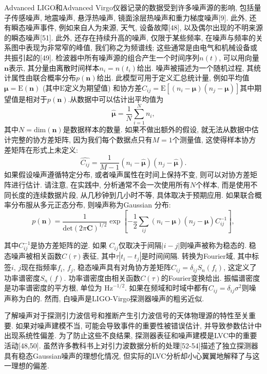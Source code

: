 \documentclass[a4paper]{\documentclassname}
\def\b{\boldsymbol}
\def\t{\text}
\theoremstyle{definition}
\begin{document}
Advanced LIGO和Advanced Virgo仪器记录的数据受到许多噪声源的影响, 包括量子传感噪声, 地震噪声, 悬浮热噪声, 镜面涂层热噪声和重力梯度噪声[9]. 此外, 还有瞬态噪声事件, 例如来自人为来源, 天气, 设备故障[48], 以及偶尔出现的不明来源的瞬态噪声[51]. 此外, 还存在持续升高的噪声, 仅限于某些频率, 在噪声与频率的关系图中表现为非常窄的峰值, 我们称之为频谱线; 这些通常是由电气和机械设备或共振引起的[49]. 检波器中所有噪声源的组合产生一个时间序列$n(t)$, 可以用向量$\b{n}$表示, 其分量由离散时间样本$n_i=n(t_i)$给出. 噪声被描述为一个随机过程, 其统计属性由联合概率分布$p(\b{n})$给出. 此模型可用于定义汇总统计量, 例如平均值$\b{\mu}=\mathrm{E}(\b{n})$ (其中$\mathrm{E}$定义为期望值) 和协方差$C_{ij}=\mathrm{E}[(n_i-\b{\mu})(n_j-\b{\mu})]$其中期望值是相对于$p(\b{n})$.从数据中可以估计出平均值为
\begin{equation}
    \hat{\b{\mu}}=\frac{1}{N}\sum_{i=1}^N n_i,
\end{equation}
其中$N=\mathrm{dim}(\b{n})$是数据样本的数量. 如果不做出额外的假设, 就无法从数据中估计完整的协方差矩阵, 因为我们每个数据点只有$ M = 1 $个测量值, 这使得样本协方差矩阵在形式上未定义:
\begin{equation}
    \hat{C_{ij}}=\frac{1}{M-1}(n_i-\hat{\b{\mu}})(n_j-\hat{\b{\mu}}).
\end{equation}
如果假设噪声遵循特定分布, 或者噪声属性在时间上保持不变, 则可以对协方差矩阵进行估计. 请注意, 在实践中, 分析通常不会一次使用所有$ N $个样本, 而是使用不同长度的连续数据片段, 从几秒钟到几小时不等, 具体取决于预期应用. 如果联合概率分布服从多元正态分布, 则噪声称为Gaussian 分布:
\begin{equation}
    p(\b{n})=\frac{1}{\mathrm{det}(2\pi\b{C})^{1/2}}\exp\left[-\frac{1}{2}\sum_{ij}(n_i-\b{\mu})(n_j-\b{\mu})C_{ij}^{-1}\right],
\end{equation}
 
其中$C_{ij}^{-1}$是协方差矩阵的逆. 如果 $C_{ij}$仅取决于间隔$|i-j|$则噪声被称为稳态的. 稳态噪声被相关函数$C(\tau)$表征, 其中$\tau|t_i-t_j|$是时间间隔. 转换为Fourier域, 其中标签$i$, $j$现在指频率$f_i$, $f_j$, 稳态噪声具有对角协方差矩阵$C_{ij}=\delta_{ij}S_n(f_i)$, 这定义了功率谱密度$S_n(f)$. 功率谱密度由相关函数$C(\tau)$的Fourier变换给出. 振幅谱密度是功率谱密度的平方根, 单位为 $\t{Hz}^{-1/2}$. 如果在频域和时域中都有$C_{ij}=\delta_{ij}\sigma^2$则噪声称为白的. 然而, 白噪声是LIGO-Virgo探测器噪声的粗劣近似.

了解噪声对于探测引力波信号和推断产生引力波信号的天体物理源的特性至关重要. 如果对噪声建模不当, 可能会导致事件的重要性被错误估计, 并导致参数估计中出现系统性偏差. 为了防止这些不良结果, 探测器表征和噪声建模是LVC中的重要活动[48,50].  虽然许多教科书上对引力波数据分析的处理[52-54]描述了独立探测器具有稳态Gaussian噪声的理想化情况, 但实际的LVC分析却小心翼翼地解释了与这一理想的偏差. 
\end{document}
